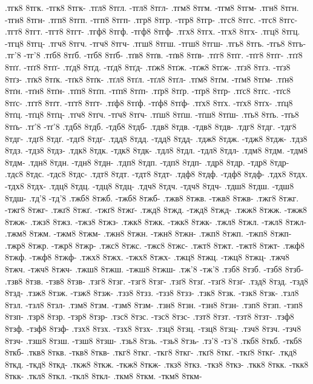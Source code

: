 {.тгк8 8тгк. -тгк8 8тгк-
.тгл8 8тгл. -тгл8 8тгл-
.тгм8 8тгм. -тгм8 8тгм-
.тгн8 8тгн. -тгн8 8тгн-
.тгп8 8тгп. -тгп8 8тгп-
.тгр8 8тгр. -тгр8 8тгр-
.тгс8 8тгс. -тгс8 8тгс-
.тгт8 8тгт. -тгт8 8тгт-
.тгф8 8тгф. -тгф8 8тгф-
.тгх8 8тгх. -тгх8 8тгх-
.тгц8 8тгц. -тгц8 8тгц-
.тгч8 8тгч. -тгч8 8тгч-
.тгш8 8тгш. -тгш8 8тгш-
.тгь8 8тгь. -тгь8 8тгь-
.тг'8 -тг'8
.тґб8 8тґб. -тґб8 8тґб-
.тґв8 8тґв. -тґв8 8тґв-
.тґг8 8тґг. -тґг8 8тґг-
.тґґ8 8тґґ. -тґґ8 8тґґ-
.тґд8 8тґд. -тґд8 8тґд-
.тґж8 8тґж. -тґж8 8тґж-
.тґз8 8тґз. -тґз8 8тґз-
.тґк8 8тґк. -тґк8 8тґк-
.тґл8 8тґл. -тґл8 8тґл-
.тґм8 8тґм. -тґм8 8тґм-
.тґн8 8тґн. -тґн8 8тґн-
.тґп8 8тґп. -тґп8 8тґп-
.тґр8 8тґр. -тґр8 8тґр-
.тґс8 8тґс. -тґс8 8тґс-
.тґт8 8тґт. -тґт8 8тґт-
.тґф8 8тґф. -тґф8 8тґф-
.тґх8 8тґх. -тґх8 8тґх-
.тґц8 8тґц. -тґц8 8тґц-
.тґч8 8тґч. -тґч8 8тґч-
.тґш8 8тґш. -тґш8 8тґш-
.тґь8 8тґь. -тґь8 8тґь-
.тґ'8 -тґ'8
.тдб8 8тдб. -тдб8 8тдб-
.тдв8 8тдв. -тдв8 8тдв-
.тдг8 8тдг. -тдг8 8тдг-
.тдґ8 8тдґ. -тдґ8 8тдґ-
.тдд8 8тдд. -тдд8 8тдд-
.тдж8 8тдж. -тдж8 8тдж-
.тдз8 8тдз. -тдз8 8тдз-
.тдк8 8тдк. -тдк8 8тдк-
.тдл8 8тдл. -тдл8 8тдл-
.тдм8 8тдм. -тдм8 8тдм-
.тдн8 8тдн. -тдн8 8тдн-
.тдп8 8тдп. -тдп8 8тдп-
.тдр8 8тдр. -тдр8 8тдр-
.тдс8 8тдс. -тдс8 8тдс-
.тдт8 8тдт. -тдт8 8тдт-
.тдф8 8тдф. -тдф8 8тдф-
.тдх8 8тдх. -тдх8 8тдх-
.тдц8 8тдц. -тдц8 8тдц-
.тдч8 8тдч. -тдч8 8тдч-
.тдш8 8тдш. -тдш8 8тдш-
.тд'8 -тд'8
.тжб8 8тжб. -тжб8 8тжб-
.тжв8 8тжв. -тжв8 8тжв-
.тжг8 8тжг. -тжг8 8тжг-
.тжґ8 8тжґ. -тжґ8 8тжґ-
.тжд8 8тжд. -тжд8 8тжд-
.тжж8 8тжж. -тжж8 8тжж-
.тжз8 8тжз. -тжз8 8тжз-
.тжк8 8тжк. -тжк8 8тжк-
.тжл8 8тжл. -тжл8 8тжл-
.тжм8 8тжм. -тжм8 8тжм-
.тжн8 8тжн. -тжн8 8тжн-
.тжп8 8тжп. -тжп8 8тжп-
.тжр8 8тжр. -тжр8 8тжр-
.тжс8 8тжс. -тжс8 8тжс-
.тжт8 8тжт. -тжт8 8тжт-
.тжф8 8тжф. -тжф8 8тжф-
.тжх8 8тжх. -тжх8 8тжх-
.тжц8 8тжц. -тжц8 8тжц-
.тжч8 8тжч. -тжч8 8тжч-
.тжш8 8тжш. -тжш8 8тжш-
.тж'8 -тж'8
.тзб8 8тзб. -тзб8 8тзб-
.тзв8 8тзв. -тзв8 8тзв-
.тзг8 8тзг. -тзг8 8тзг-
.тзґ8 8тзґ. -тзґ8 8тзґ-
.тзд8 8тзд. -тзд8 8тзд-
.тзж8 8тзж. -тзж8 8тзж-
.тзз8 8тзз. -тзз8 8тзз-
.тзк8 8тзк. -тзк8 8тзк-
.тзл8 8тзл. -тзл8 8тзл-
.тзм8 8тзм. -тзм8 8тзм-
.тзн8 8тзн. -тзн8 8тзн-
.тзп8 8тзп. -тзп8 8тзп-
.тзр8 8тзр. -тзр8 8тзр-
.тзс8 8тзс. -тзс8 8тзс-
.тзт8 8тзт. -тзт8 8тзт-
.тзф8 8тзф. -тзф8 8тзф-
.тзх8 8тзх. -тзх8 8тзх-
.тзц8 8тзц. -тзц8 8тзц-
.тзч8 8тзч. -тзч8 8тзч-
.тзш8 8тзш. -тзш8 8тзш-
.тзь8 8тзь. -тзь8 8тзь-
.тз'8 -тз'8
.ткб8 8ткб. -ткб8 8ткб-
.ткв8 8ткв. -ткв8 8ткв-
.ткг8 8ткг. -ткг8 8ткг-
.ткґ8 8ткґ. -ткґ8 8ткґ-
.ткд8 8ткд. -ткд8 8ткд-
.ткж8 8ткж. -ткж8 8ткж-
.ткз8 8ткз. -ткз8 8ткз-
.ткк8 8ткк. -ткк8 8ткк-
.ткл8 8ткл. -ткл8 8ткл-
.ткм8 8ткм. -ткм8 8ткм-
}
